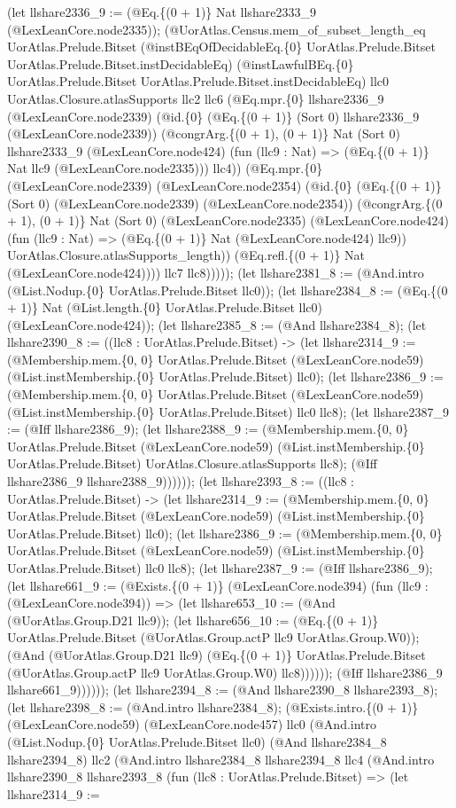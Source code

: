 \documentclass[11pt]{article}
\begin{document}
(let llshare2336\_9 := (@Eq.\{(0 + 1)\} Nat llshare2333\_9 (@LexLeanCore.node2335)); (@UorAtlas.Census.mem\_of\_subset\_length\_eq UorAtlas.Prelude.Bitset (@instBEqOfDecidableEq.\{0\} UorAtlas.Prelude.Bitset UorAtlas.Prelude.Bitset.instDecidableEq) (@instLawfulBEq.\{0\} UorAtlas.Prelude.Bitset UorAtlas.Prelude.Bitset.instDecidableEq) llc0 UorAtlas.Closure.atlasSupports llc2 llc6 (@Eq.mpr.\{0\} llshare2336\_9 (@LexLeanCore.node2339) (@id.\{0\} (@Eq.\{(0 + 1)\} (Sort 0) llshare2336\_9 (@LexLeanCore.node2339)) (@congrArg.\{(0 + 1), (0 + 1)\} Nat (Sort 0) llshare2333\_9 (@LexLeanCore.node424) (fun (llc9 : Nat) => (@Eq.\{(0 + 1)\} Nat llc9 (@LexLeanCore.node2335))) llc4)) (@Eq.mpr.\{0\} (@LexLeanCore.node2339) (@LexLeanCore.node2354) (@id.\{0\} (@Eq.\{(0 + 1)\} (Sort 0) (@LexLeanCore.node2339) (@LexLeanCore.node2354)) (@congrArg.\{(0 + 1), (0 + 1)\} Nat (Sort 0) (@LexLeanCore.node2335) (@LexLeanCore.node424) (fun (llc9 : Nat) => (@Eq.\{(0 + 1)\} Nat (@LexLeanCore.node424) llc9)) UorAtlas.Closure.atlasSupports\_length)) (@Eq.refl.\{(0 + 1)\} Nat (@LexLeanCore.node424)))) llc7 llc8))))); (let llshare2381\_8 := (@And.intro (@List.Nodup.\{0\} UorAtlas.Prelude.Bitset llc0)); (let llshare2384\_8 := (@Eq.\{(0 + 1)\} Nat (@List.length.\{0\} UorAtlas.Prelude.Bitset llc0) (@LexLeanCore.node424)); (let llshare2385\_8 := (@And llshare2384\_8); (let llshare2390\_8 := ((llc8 : UorAtlas.Prelude.Bitset) -> (let llshare2314\_9 := (@Membership.mem.\{0, 0\} UorAtlas.Prelude.Bitset (@LexLeanCore.node59) (@List.instMembership.\{0\} UorAtlas.Prelude.Bitset) llc0); (let llshare2386\_9 := (@Membership.mem.\{0, 0\} UorAtlas.Prelude.Bitset (@LexLeanCore.node59) (@List.instMembership.\{0\} UorAtlas.Prelude.Bitset) llc0 llc8); (let llshare2387\_9 := (@Iff llshare2386\_9); (let llshare2388\_9 := (@Membership.mem.\{0, 0\} UorAtlas.Prelude.Bitset (@LexLeanCore.node59) (@List.instMembership.\{0\} UorAtlas.Prelude.Bitset) UorAtlas.Closure.atlasSupports llc8); (@Iff llshare2386\_9 llshare2388\_9)))))); (let llshare2393\_8 := ((llc8 : UorAtlas.Prelude.Bitset) -> (let llshare2314\_9 := (@Membership.mem.\{0, 0\} UorAtlas.Prelude.Bitset (@LexLeanCore.node59) (@List.instMembership.\{0\} UorAtlas.Prelude.Bitset) llc0); (let llshare2386\_9 := (@Membership.mem.\{0, 0\} UorAtlas.Prelude.Bitset (@LexLeanCore.node59) (@List.instMembership.\{0\} UorAtlas.Prelude.Bitset) llc0 llc8); (let llshare2387\_9 := (@Iff llshare2386\_9); (let llshare661\_9 := (@Exists.\{(0 + 1)\} (@LexLeanCore.node394) (fun (llc9 : (@LexLeanCore.node394)) => (let llshare653\_10 := (@And (@UorAtlas.Group.D21 llc9)); (let llshare656\_10 := (@Eq.\{(0 + 1)\} UorAtlas.Prelude.Bitset (@UorAtlas.Group.actP llc9 UorAtlas.Group.W0)); (@And (@UorAtlas.Group.D21 llc9) (@Eq.\{(0 + 1)\} UorAtlas.Prelude.Bitset (@UorAtlas.Group.actP llc9 UorAtlas.Group.W0) llc8)))))); (@Iff llshare2386\_9 llshare661\_9)))))); (let llshare2394\_8 := (@And llshare2390\_8 llshare2393\_8); (let llshare2398\_8 := (@And.intro llshare2384\_8); (@Exists.intro.\{(0 + 1)\} (@LexLeanCore.node59) (@LexLeanCore.node457) llc0 (@And.intro (@List.Nodup.\{0\} UorAtlas.Prelude.Bitset llc0) (@And llshare2384\_8 llshare2394\_8) llc2 (@And.intro llshare2384\_8 llshare2394\_8 llc4 (@And.intro llshare2390\_8 llshare2393\_8 (fun (llc8 : UorAtlas.Prelude.Bitset) => (let llshare2314\_9 := 
\end{document}
